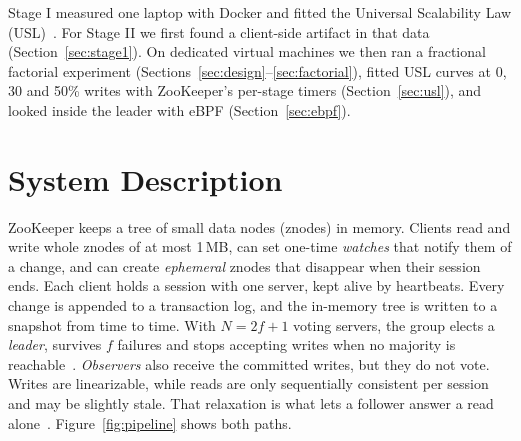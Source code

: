 \documentclass{llncs}
\begin{document}
Stage I measured one laptop with Docker and fitted the Universal Scalability Law (USL)~\cite{gunther_usl_dsconf,gunther_book}. For Stage II we first found a client-side artifact in that data (Section~\ref{sec:stage1}). On dedicated virtual machines we then ran a fractional factorial experiment (Sections~\ref{sec:design}--\ref{sec:factorial}), fitted USL curves at 0, 30 and 50\% writes with ZooKeeper's per-stage timers (Section~\ref{sec:usl}), and looked inside the leader with eBPF (Section~\ref{sec:ebpf}).

\section{System Description}
\label{sec:system}

ZooKeeper keeps a tree of small data nodes (znodes) in memory. Clients read and write whole znodes of at most 1\,MB, can set one-time \emph{watches} that notify them of a change, and can create \emph{ephemeral} znodes that disappear when their session ends. Each client holds a session with one server, kept alive by heartbeats. Every change is appended to a transaction log, and the in-memory tree is written to a snapshot from time to time. With $N=2f+1$ voting servers, the group elects a \emph{leader}, survives $f$ failures and stops accepting writes when no majority is reachable~\cite{zab_junqueira}. \emph{Observers} also receive the committed writes, but they do not vote. Writes are linearizable, while reads are only sequentially consistent per session and may be slightly stale. That relaxation is what lets a follower answer a read alone~\cite{hunt_zookeeper}. Figure~\ref{fig:pipeline} shows both paths.
\end{document}
